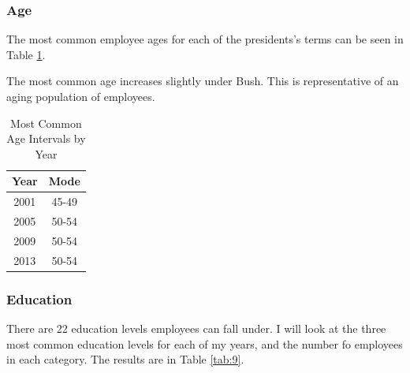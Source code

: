 \documentclass{article}
\begin{document}
        \subsubsection{Age}
        The most common employee ages for each of the presidents's terms can be seen in Table \ref{tab:8}.
        \par
        The most common age increases slightly under Bush. This is representative of an aging population of employees.

            \begin{center}
                \begin{table}
                    \centering
                    \begin{tabular}{ |c|c| }
                        \hline
                        Year & Mode \\
                        \hline
                        2001 & 45-49 \\
                        2005 & 50-54 \\
                        2009 & 50-54 \\
                        2013 & 50-54 \\
                        \hline
                    \end{tabular}
                    \caption{Most Common Age Intervals by Year}
                    \label{tab:8}
                \end{table}
            \end{center}

        \subsubsection{Education}
        There are 22 education levels employees can fall under. I will look at the three most common education levels for each of my years, and the number fo employees in each category. The results are in Table \ref{tab:9}.
\end{document}
